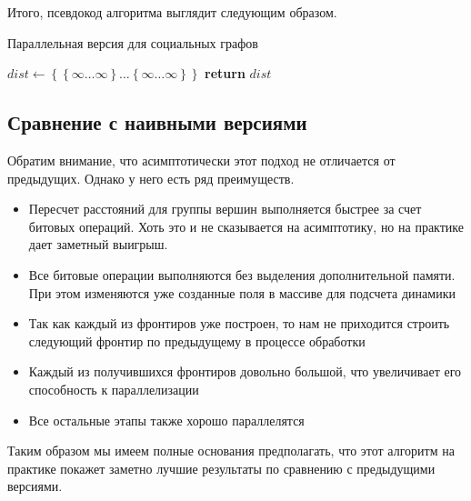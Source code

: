Итого, псевдокод алгоритма выглядит следующим образом.

\FloatBarrier
\begin{algorithm}
\caption{Параллельная версия для социальных графов}\label{all_pairs_social}
\begin{algorithmic}[1]

\State $dist\gets \left\{ {   \left\{ {\infty \ldots \infty}\right\}  \ldots \left\{ {\infty \ldots \infty}\right\} }\right\}$
 
\State \textbf{return} $dist$ 
\EndProcedure

\end{algorithmic}
\end{algorithm}


\FloatBarrier
\subsection{Сравнение с наивными версиями}

Обратим внимание, что асимптотически этот подход не отличается от предыдущих. Однако у него есть ряд преимуществ. 

\begin{itemize}
  \item Пересчет расстояний для группы вершин выполняется быстрее за счет битовых операций. Хоть это и не сказывается на асимптотику, но на практике дает заметный выигрыш. 
  \item Все битовые операции выполняются без выделения дополнительной памяти. При этом изменяются уже созданные поля в массиве для подсчета динамики
  \item Так как каждый из фронтиров уже построен, то нам не приходится строить следующий фронтир по предыдущему в процессе обработки
  \item Каждый из получившихся фронтиров довольно большой, что увеличивает его способность к параллелизации
  \item Все остальные этапы также хорошо параллелятся
\end{itemize}

Таким образом мы имеем полные основания предполагать, что этот алгоритм на практике покажет заметно лучшие результаты по сравнению с предыдущими версиями. 

